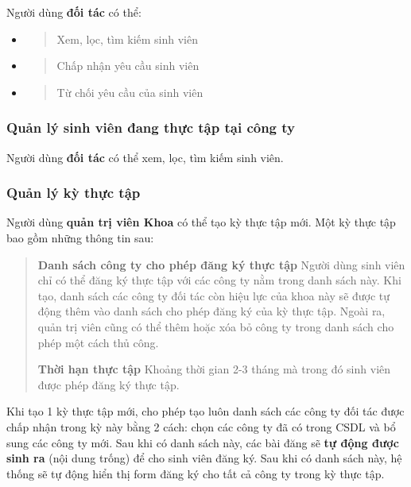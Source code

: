 \documentclass[./../main.tex]{subfiles}
\begin{document}
Người dùng \textbf{đối tác} có thể:
  
\begin{itemize}
	\item
	      \begin{quote}
	      	Xem, lọc, tìm kiếm sinh viên
	      \end{quote}
	\item
	      \begin{quote}
	      	Chấp nhận yêu cầu sinh viên
	      \end{quote}
	\item
	      \begin{quote}
	      	Từ chối yêu cầu của sinh viên
	      \end{quote}
\end{itemize}
  
\hypertarget{quux1ea3n-luxfd-sinh-viuxean-ux111ang-thux1ef1c-tux1eadp-tux1ea1i-cuxf4ng-ty}{%
	\subsubsection{Quản lý sinh viên đang thực tập tại công
		ty}\label{quux1ea3n-luxfd-sinh-viuxean-ux111ang-thux1ef1c-tux1eadp-tux1ea1i-cuxf4ng-ty}}
  
Người dùng \textbf{đối tác} có thể xem, lọc, tìm kiếm sinh viên.
  
\hypertarget{quux1ea3n-luxfd-kux1ef3-thux1ef1c-tux1eadp}{%
	\subsubsection{Quản lý kỳ thực
		tập}\label{quux1ea3n-luxfd-kux1ef3-thux1ef1c-tux1eadp}}
  
Người dùng \textbf{quản trị viên Khoa} có thể tạo kỳ thực tập mới. Một
kỳ thực tập bao gồm những thông tin sau:
  
\begin{quote}
	\textbf{Danh sách công ty cho phép đăng ký thực tập} Người dùng sinh
	viên chỉ có thể đăng ký thực tập với các công ty nằm trong danh sách
	này. Khi tạo, danh sách các công ty đối tác còn hiệu lực của khoa này sẽ
	được tự động thêm vào danh sách cho phép đăng ký của kỳ thực tập. Ngoài
	ra, quản trị viên cũng có thể thêm hoặc xóa bỏ công ty trong danh sách
	cho phép một cách thủ công.
	  
	\textbf{Thời hạn thực tập} Khoảng thời gian 2-3 tháng mà trong đó sinh
	viên được phép đăng ký thực tập.
\end{quote}
  
Khi tạo 1 kỳ thực tập mới, cho phép tạo luôn danh sách các công ty đối
tác được chấp nhận trong kỳ này bằng 2 cách: chọn các công ty đã có
trong CSDL và bổ sung các công ty mới. Sau khi có danh sách này, các bài
đăng sẽ \textbf{tự động được sinh ra} (nội dung trống) để cho sinh viên
đăng ký. Sau khi có danh sách này, hệ thống sẽ tự động hiển thị form
đăng ký cho tất cả công ty trong kỳ thực tập.
  
\end{document}
